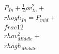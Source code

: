 \documentclass[preview]{standalone}
\begin{document}
\begin{align*}
P_{In} + \frac{1}{2} \rho v_{In}^2 +  \\rho gh_{In}  =  P_{mid} + \\frac{1}{2} \\rho v_{Middle}^2 +  \\rho gh_{Middle}
\end{align*}
\end{document}
